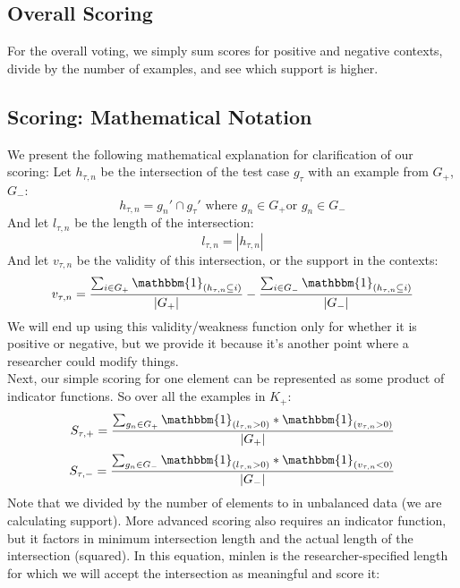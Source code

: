 \documentclass[12pt, a4, epsf] {article}
\theoremstyle{plain}
\theoremstyle{definition}
\begin{document}
\subsection*{Overall Scoring}
For the overall voting, we simply sum scores for positive and negative contexts, divide by the number of examples, and see which support is higher.
\subsection*{Scoring: Mathematical Notation}
We present the following mathematical explanation for clarification of our scoring:
Let $h_{\tau,n}$ be the intersection of the test case $g_{\tau}$ with an example from $G_+$,$G_-$:\\
\begin{equation}
h_{\tau,n} = g_{n}' \cap g_{\tau}' \text{ where } g_n \in G_+ \text{or } g_n \in G_-
\end{equation}
And let $l_{\tau,n}$ be the length of the intersection:\\
\begin{equation}
l_{\tau,n} = |h_{\tau,n}|
\end{equation}
And let $v_{\tau,n}$ be the validity of this intersection, or the support in the contexts:\\
\begin{equation}
v_{\tau,n} = \frac{\sum_{i \in G_+}\mathbbm{1}_{(h_{\tau,n} \subseteq i)}}{|G_+|} - \frac{\sum_{i \in G_-}\mathbbm{1}_{(h_{\tau,n} \subseteq i)}}{|G_-|}  
\end{equation} 
We will end up using this validity/weakness function only for whether it is positive or negative, but we provide it because it's another point where a researcher could modify things. \\
Next, our simple scoring for one element can be represented as some product of indicator functions. So over all the examples in $K_+$:\\
\begin{equation}
S_{\tau,+} = \frac{\sum_{g_n \in G_+}{\mathbbm{1}_{(l_{\tau,n}>0)}}*\mathbbm{1}_{(v_{\tau,n}>0)}}{|G_+|}
\end{equation}
\begin{equation}
S_{\tau,-} = \frac{\sum_{g_n \in G_-}{\mathbbm{1}_{(l_{\tau,n}>0)}}*\mathbbm{1}_{(v_{\tau,n}<0)}}{|G_-|}
\end{equation}
Note that we divided by the number of elements to in unbalanced data (we are calculating support). More advanced scoring also requires an indicator function, but it factors in minimum intersection length and the actual length of the intersection (squared). In this equation, minlen is the researcher-specified length for which we will accept the intersection as meaningful and score it:\\
\end{document}
